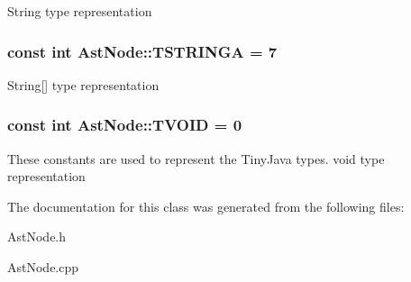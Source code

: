 \label{classAstNode_a2245a2aec841592ecddf8f9497306a4b}
String type representation \hypertarget{classAstNode_ae3a9310b89b8c86afe245cf88ab1369a}{
\subsubsection[{TSTRINGA}]{\setlength{\rightskip}{0pt plus 5cm}const int {\bf AstNode::TSTRINGA} = 7}}
\label{classAstNode_ae3a9310b89b8c86afe245cf88ab1369a}
String\mbox{[}\mbox{]} type representation \hypertarget{classAstNode_ac664e0864b9c856e947d5fde632eb5e7}{
\subsubsection[{TVOID}]{\setlength{\rightskip}{0pt plus 5cm}const int {\bf AstNode::TVOID} = 0}}
\label{classAstNode_ac664e0864b9c856e947d5fde632eb5e7}
These constants are used to represent the TinyJava types. void type representation 

The documentation for this class was generated from the following files:\begin{DoxyCompactItemize}
\item 
AstNode.h\item 
AstNode.cpp\end{DoxyCompactItemize}
